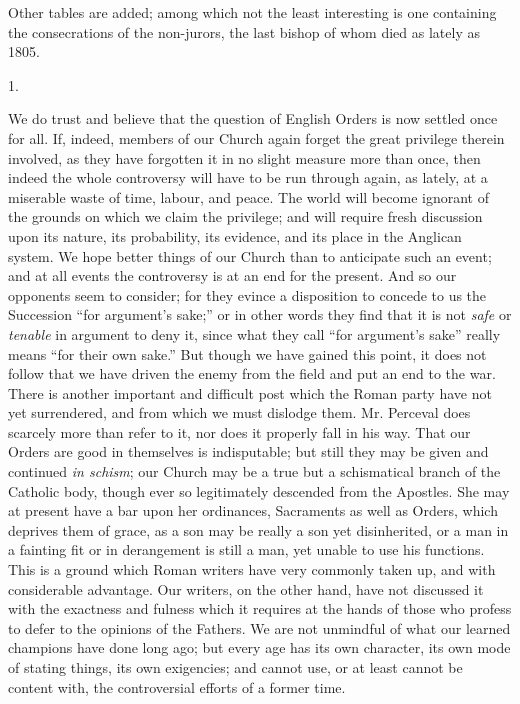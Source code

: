 Other tables are added; among which not the least
interesting is one containing the consecrations of the non-jurors, the
last bishop of whom died as lately as 1805.

1.

We do trust and believe that the question of
English Orders is now settled once for all. If, indeed, members of our
Church again forget the great privilege therein involved, as they have
forgotten it in no slight measure more than once, then indeed the
whole controversy will have to be run through again, as lately, at
a miserable waste of time, labour, and peace. The world will become
ignorant of the grounds on which we claim the privilege; and will
require fresh discussion upon its nature, its probability, its
evidence, and its place in the Anglican system. We hope better things
of our Church than to anticipate such an event; and at all events the
controversy is at an end for the present. And so our opponents seem to
consider; for they evince a disposition to concede to us the
Succession ``for argument's sake;'' or in other words they find that it
is not \emph{safe} or \emph{tenable} in argument to deny it, since
what they call ``for argument's sake'' really means ``for their own sake.''
But though we have gained this point, it does not follow that we have
driven the enemy from the field and put an end to the war. There is
another important and difficult post which the Roman party have not
yet surrendered, and from which we must dislodge them. Mr. Perceval
does scarcely more than refer to it, nor does it properly fall in his
way. That our Orders are good in themselves is indisputable; but still
they may be given and continued \emph{in schism}; our Church may be a
true but a schismatical branch of the Catholic body, though ever so
legitimately descended from the Apostles. She may at present have a
bar upon her ordinances, Sacraments as well as Orders, which deprives
them of grace, as a son may be really a son yet disinherited, or a man
in a fainting fit or in derangement is still a man, yet unable to use
his functions. This is a ground which Roman writers have very commonly
taken up, and with considerable advantage. Our writers, on the other
hand, have not discussed it with the exactness and fulness which it
requires at the hands of those who profess to defer to the opinions of
the Fathers. We are not unmindful of what our learned champions
have done long ago; but every age has its own character, its own mode
of stating things, its own exigencies; and cannot use, or at least
cannot be content with, the controversial efforts of a former time.


